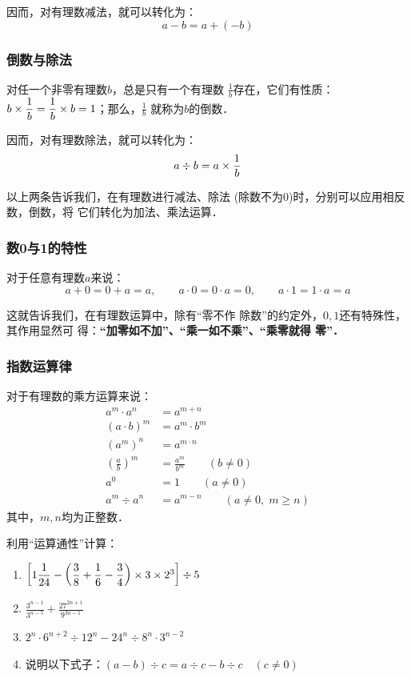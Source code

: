 因而，对有理数减法，就可以转化为：
\[a-b=a+(-b)\]

\subsubsection{倒数与除法}
\begin{blk}{}
	对任一个非零有理数$b$，总是只有一个有理数
	$\frac{1}{b}$存在，它们有性质：$b\times\dfrac{1}{b}= \dfrac{1}{b} \times b=1$；那么，$\frac{1}{b}$
	就称为$b$的倒数．
\end{blk}

因而，对有理数除法，就可以转化为：
\[a\div b=a\times\dfrac{1}{b}\]

以上两条告诉我们，在有理数进行减法、除法
(除数不为0)时，分别可以应用相反数，倒数，将
它们转化为加法、乘法运算．

\subsubsection{数0与1的特性}
\begin{blk}{}
	对于任意有理数$a$来说：
	\[a+0=0+a=a,\qquad  a\cdot 0=0\cdot a=0,\qquad a\cdot 1=1\cdot a=a\]
\end{blk}

这就告诉我们，在有理数运算中，除有“零不作
除数”的约定外，$0,  1$还有特殊性，其作用显然可
得：\textbf{“加零如不加”、“乘一如不乘”、“乘零就得
	零”．}

\subsubsection{指数运算律}
\begin{blk}{}
	对于有理数的乘方运算来说：
	\[\begin{split}
	a^m\cdot a^n&=a^{m+n}\\
	(a\cdot b)^m&=a^{m}\cdot b^m\\
	(a^m)^n&=a^{m\cdot n}\\
	\left(\frac{a}{b}\right)^m&=\frac{a^m}{b^m}\qquad (b\ne 0)\\
	a^0&=1\qquad (a\ne 0)\\
	a^m\div a^n&=a^{m-n} \qquad (a\ne 0,\; m\ge n)
	\end{split}\]
	其中，$m, n$均为正整数．
\end{blk}

\begin{ex}
	利用“运算通性”计算：
	\begin{enumerate}
		\item $\left[1\dfrac{1}{24}-\left(\dfrac{3}{8}+\dfrac{1}{6}-\dfrac{3}{4}\right)\times3\times2^3\right]\div 5$
		\item $\frac{3^{n-1}}{3^{n-5}}+\frac{27^{2n+1}}{9^{3n-1}}$
		\item $2^n\cdot 6^{n+2}\div 12^n-24^n\div 8^n\cdot 3^{n-2}$
		\item 说明以下式子：$(a-b)\div c=a\div c-b\div c\quad (c\ne 0)$
	\end{enumerate}
	
\end{ex}

